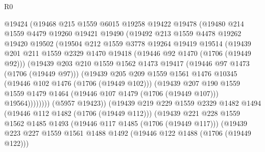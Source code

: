 \begin{lexlean}{R0}
\begin{coremodule}
              @19424
              (@19468
                @215
                @1559
                @6015
                @19258
                @19422
                @19478
                (@19480
                  @214
                  @1559
                  @4479
                  @19260
                  @19421
                  @19490
                  (@19492
                    @213
                    @1559
                    @4478
                    @19262
                    @19420
                    @19502
                    (@19504
                      @212
                      @1559
                      @3778
                      @19264
                      @19419
                      @19514
                      (@19439
                        @201
                        @211
                        @1559
                        @2329
                        @1470
                        @19418
                        (@19446 @92 @1470 (@1706 (@19449 @92)))
                        (@19439
                          @203
                          @210
                          @1559
                          @1562
                          @1473
                          @19417
                          (@19446 @97 @1473 (@1706 (@19449 @97)))
                          (@19439
                            @205
                            @209
                            @1559
                            @1561
                            @1476
                            @10345
                            (@19446 @102 @1476 (@1706 (@19449 @102)))
                            (@19439
                              @207
                              @190
                              @1559
                              @1559
                              @1479
                              @1464
                              (@19446 @107 @1479 (@1706 (@19449 @107)))
                              @19564))))))))
              (@5957 @19423))
            (@19439
              @219
              @229
              @1559
              @2329
              @1482
              @1494
              (@19446 @112 @1482 (@1706 (@19449 @112)))
              (@19439
                @221
                @228
                @1559
                @1562
                @1485
                @1493
                (@19446 @117 @1485 (@1706 (@19449 @117)))
                (@19439
                  @223
                  @227
                  @1559
                  @1561
                  @1488
                  @1492
                  (@19446 @122 @1488 (@1706 (@19449 @122)))

\end{coremodule}
\end{lexlean}
